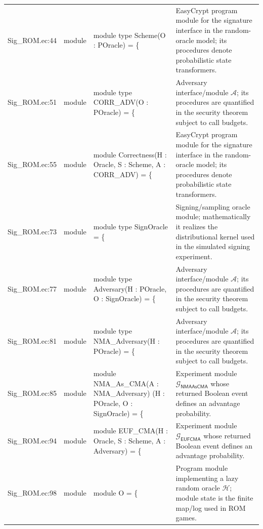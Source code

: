 \documentclass[10pt]{article}
\begin{document}
\begin{longtable}{L{0.11\textwidth}L{0.055\textwidth}L{0.385\textwidth}L{0.41\textwidth}}
Sig\_\allowbreak{}ROM.\allowbreak{}ec:\allowbreak{}44 & module & {\ttfamily\scriptsize module type Scheme(O : POracle) = \{} & EasyCrypt program module for the signature interface in the random-oracle model; its procedures denote probabilistic state transformers. \\
Sig\_\allowbreak{}ROM.\allowbreak{}ec:\allowbreak{}51 & module & {\ttfamily\scriptsize module type CORR\_\allowbreak{}ADV(O : POracle) = \{} & Adversary interface/module $\mathcal A$; its procedures are quantified in the security theorem subject to call budgets. \\
Sig\_\allowbreak{}ROM.\allowbreak{}ec:\allowbreak{}55 & module & {\ttfamily\scriptsize module Correctness(H : Oracle, S : Scheme, A : CORR\_\allowbreak{}ADV) = \{} & EasyCrypt program module for the signature interface in the random-oracle model; its procedures denote probabilistic state transformers. \\
Sig\_\allowbreak{}ROM.\allowbreak{}ec:\allowbreak{}73 & module & {\ttfamily\scriptsize module type SignOracle = \{} & Signing/sampling oracle module; mathematically it realizes the distributional kernel used in the simulated signing experiment. \\
Sig\_\allowbreak{}ROM.\allowbreak{}ec:\allowbreak{}77 & module & {\ttfamily\scriptsize module type Adversary(H : POracle, O : SignOracle) = \{} & Adversary interface/module $\mathcal A$; its procedures are quantified in the security theorem subject to call budgets. \\
Sig\_\allowbreak{}ROM.\allowbreak{}ec:\allowbreak{}81 & module & {\ttfamily\scriptsize module type NMA\_\allowbreak{}Adversary(H : POracle) = \{} & Adversary interface/module $\mathcal A$; its procedures are quantified in the security theorem subject to call budgets. \\
Sig\_\allowbreak{}ROM.\allowbreak{}ec:\allowbreak{}85 & module & {\ttfamily\scriptsize module NMA\_\allowbreak{}As\_\allowbreak{}CMA(A : NMA\_\allowbreak{}Adversary) (H : POracle, O : SignOracle) = \{} & Experiment module $\mathcal G_{\mathsf{NMAAsCMA}}$ whose returned Boolean event defines an advantage probability. \\
Sig\_\allowbreak{}ROM.\allowbreak{}ec:\allowbreak{}94 & module & {\ttfamily\scriptsize module EUF\_\allowbreak{}CMA(H : Oracle, S : Scheme, A : Adversary) = \{} & Experiment module $\mathcal G_{\mathsf{EUFCMA}}$ whose returned Boolean event defines an advantage probability. \\
Sig\_\allowbreak{}ROM.\allowbreak{}ec:\allowbreak{}98 & module & {\ttfamily\scriptsize module O = \{} & Program module implementing a lazy random oracle $\mathcal H$; module state is the finite map/log used in ROM games. \\

\end{longtable}
\end{document}
